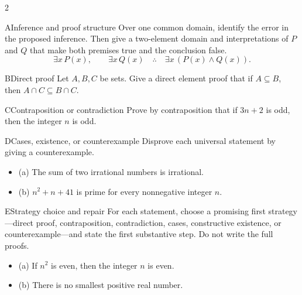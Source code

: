 \documentclass[9pt]{extarticle}
\begin{document}
\begin{multicols}{2}
\begin{CoreProblem}{A}{Inference and proof structure}
Over one common domain, identify the error in the proposed inference. Then give
a two-element domain and interpretations of $P$ and $Q$ that make both premises
true and the conclusion false.
\[
\exists x\,P(x),\qquad \exists x\,Q(x)
\quad\therefore\quad
\exists x\,(P(x)\land Q(x)).
\]
\end{CoreProblem}
\begin{CoreProblem}{B}{Direct proof}
Let $A,B,C$ be sets. Give a direct element proof that if $A\subseteq B$, then
$A\cap C\subseteq B\cap C$.
\end{CoreProblem}
\begin{CoreProblem}{C}{Contraposition or contradiction}
Prove by contraposition that if $3n+2$ is odd, then the integer $n$ is odd.
\end{CoreProblem}
\columnbreak
\begin{CoreProblem}{D}{Cases, existence, or counterexample}
Disprove each universal statement by giving a counterexample.
\begin{itemize}
  \item (a) The sum of two irrational numbers is irrational.
  \item (b) $n^2+n+41$ is prime for every nonnegative integer $n$.
\end{itemize}
\end{CoreProblem}
\begin{CoreProblem}{E}{Strategy choice and repair}
For each statement, choose a promising first strategy---direct proof,
contraposition, contradiction, cases, constructive existence, or
counterexample---and state the first substantive step. Do not write the full
proofs.
\begin{itemize}
  \item (a) If $n^2$ is even, then the integer $n$ is even.
  \item (b) There is no smallest positive real number.
\end{itemize}
\end{CoreProblem}
\end{multicols}
\CoreWorkArea
\FormBreak
{}
\end{document}
